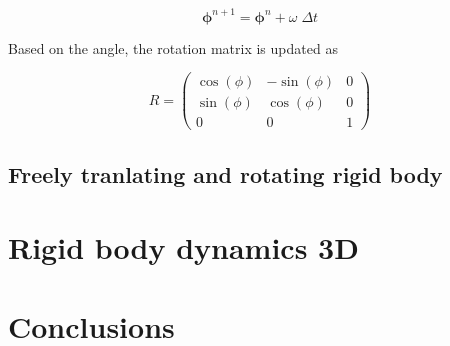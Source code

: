 \documentclass[preprint,12pt]{elsarticle}
\newcommand{\ten}[1]{\ensuremath{\mathbf{#1}}}
\begin{document}
\begin{equation}
  \label{eq:rfc:lin_vel_cm_update}
  \ten{\phi}^{n+1} = \ten{\phi}^{n} + \omega \; \Delta t
\end{equation}

Based on the angle, the rotation matrix is updated as

\begin{equation}
  R =
\begin{pmatrix}
    \cos(\phi) & -\sin(\phi) & 0 \\
   \sin(\phi)  & \cos(\phi) & 0 \\
    0 & 0 & 1
\end{pmatrix}
\end{equation}






\FloatBarrier%
\subsection{Freely tranlating and rotating rigid body}
\label{sec:rb_2d}


\FloatBarrier%
\section{Rigid body dynamics 3D}
\label{sec:rb_3d}



\FloatBarrier%
\section{Conclusions}
\label{sec:conclusions}






\end{document}
